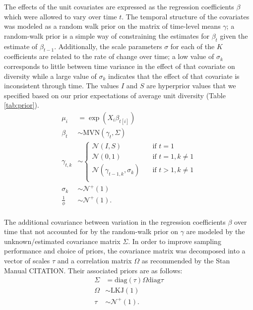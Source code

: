 \documentclass[12pt,letterpaper]{article}
\begin{document}
The effects of the unit covariates are expressed as the regression coefficients \(\beta\) which were allowed to vary over time \(t\). The temporal structure of the covariates was modeled as a random walk prior on the matrix of time-level means \(\gamma\); a random-walk prior is a simple way of constraining the estimates for \(\beta_{t}\) given the estimate of \(\beta_{t - 1}\). Additionally, the scale parameters \(\sigma\) for each of the \(K\) coefficients are related to the rate of change over time; a low value of \(\sigma_{k}\) corresponds to little between time variance in the effect of that covariate on diversity while a large value of \(\sigma_{k}\) indicates that the effect of that covariate is inconsistent through time. The values \(I\) and \(S\) are hyperprior values that we specified based on our prior expectations of average unit diversity (Table \ref{tab:prior}).
\begin{equation}
  \begin{aligned}
    \mu_{i} &= \exp(X_{i} \beta_{t[i]}) \\
    \beta_{t} &\sim \text{MVN}(\gamma_{t}, \Sigma) \\
    \gamma_{t, k} &\sim 
    \begin{cases}
      \mathcal{N}(I, S) & \quad \text{if } t = 1 \\
      \mathcal{N}(0, 1) & \quad \text{if } t = 1, k \neq 1 \\
      \mathcal{N}(\gamma_{t - 1, k}, \sigma_{k}) & \quad \text{if } t > 1, k \neq 1 \\
    \end{cases} \\
    \sigma_{k} &\sim \mathcal{N}^{+}(1) \\ 
    \frac{1}{\phi} &\sim \mathcal{N}^{+}(1). \\
  \end{aligned}
\end{equation}

The additional covariance between variation in the regression coefficients \(\beta\) over time that not accounted for by the random-walk prior on \(\gamma\) are modeled by the unknown/estimated covariance matrix \(\Sigma\). In order to improve sampling performance and choice of priors, the covariance matrix was decomposed into a vector of scales \(\tau\) and a correlation matrix \(\Omega\) as recommended by the Stan Manual CITATION. Their associated priors are as follows:
\begin{equation}
  \begin{aligned}
    \Sigma &= \text{diag}(\tau) \Omega \text{diag}{\tau} \\
    \Omega &\sim \text{LKJ}(1) \\
    \tau &\sim \mathcal{N}^{+}(1). \\
  \end{aligned}
\end{equation}
\end{document}
